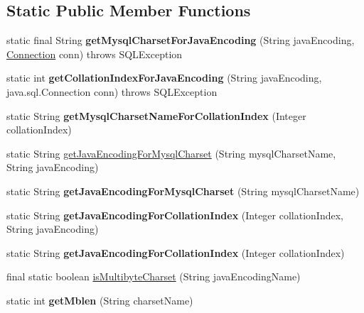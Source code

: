 \subsection*{Static Public Member Functions}
\begin{DoxyCompactItemize}
\item 
\mbox{\label{classcom_1_1mysql_1_1jdbc_1_1_charset_mapping_abbb22a59000fa583a7bc2cf16d01ae7d}} 
static final String {\bfseries get\+Mysql\+Charset\+For\+Java\+Encoding} (String java\+Encoding, \mbox{\hyperlink{interfacecom_1_1mysql_1_1jdbc_1_1_connection}{Connection}} conn)  throws S\+Q\+L\+Exception 
\item 
\mbox{\label{classcom_1_1mysql_1_1jdbc_1_1_charset_mapping_ab734ad8d3143cd5619a85eed971a0453}} 
static int {\bfseries get\+Collation\+Index\+For\+Java\+Encoding} (String java\+Encoding, java.\+sql.\+Connection conn)  throws S\+Q\+L\+Exception 
\item 
\mbox{\label{classcom_1_1mysql_1_1jdbc_1_1_charset_mapping_ae51b8d1a2bb3014b67323fccc0360e29}} 
static String {\bfseries get\+Mysql\+Charset\+Name\+For\+Collation\+Index} (Integer collation\+Index)
\item 
static String \mbox{\hyperlink{classcom_1_1mysql_1_1jdbc_1_1_charset_mapping_a1ed354f292dc235b766f7c5fa8b7cff0}{get\+Java\+Encoding\+For\+Mysql\+Charset}} (String mysql\+Charset\+Name, String java\+Encoding)
\item 
\mbox{\label{classcom_1_1mysql_1_1jdbc_1_1_charset_mapping_a70fe8d0cd371afd85f5f51d380d9cbb8}} 
static String {\bfseries get\+Java\+Encoding\+For\+Mysql\+Charset} (String mysql\+Charset\+Name)
\item 
\mbox{\label{classcom_1_1mysql_1_1jdbc_1_1_charset_mapping_af36871a03531f7722b00db15f34da5d9}} 
static String {\bfseries get\+Java\+Encoding\+For\+Collation\+Index} (Integer collation\+Index, String java\+Encoding)
\item 
\mbox{\label{classcom_1_1mysql_1_1jdbc_1_1_charset_mapping_a77db15ee74e8bb2b67cf28e277ee097b}} 
static String {\bfseries get\+Java\+Encoding\+For\+Collation\+Index} (Integer collation\+Index)
\item 
final static boolean \mbox{\hyperlink{classcom_1_1mysql_1_1jdbc_1_1_charset_mapping_a975ea312dfd719facd25053d58848d76}{is\+Multibyte\+Charset}} (String java\+Encoding\+Name)
\item 
\mbox{\label{classcom_1_1mysql_1_1jdbc_1_1_charset_mapping_aa546cca00b157b6690b849894a9c82a1}} 
static int {\bfseries get\+Mblen} (String charset\+Name)
\end{DoxyCompactItemize}
